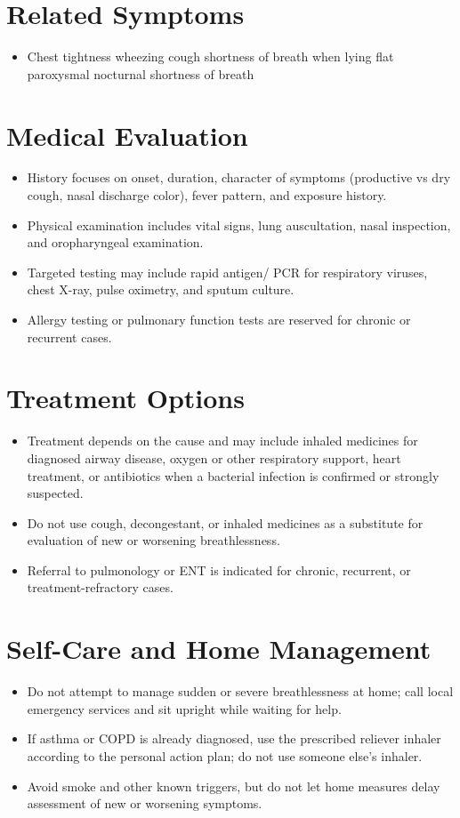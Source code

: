 \section*{Related Symptoms}
\begin{itemize}
  \item Chest tightness wheezing cough shortness of breath when lying flat paroxysmal nocturnal shortness of breath
\end{itemize}

\section*{Medical Evaluation}
\begin{itemize}
  \item History focuses on onset, duration, character of symptoms (productive vs dry cough, nasal discharge color), fever pattern, and exposure history.
  \item Physical examination includes vital signs, lung auscultation, nasal inspection, and oropharyngeal examination.
  \item Targeted testing may include rapid antigen/ PCR for respiratory viruses, chest X-ray, pulse oximetry, and sputum culture.
  \item Allergy testing or pulmonary function tests are reserved for chronic or recurrent cases.
\end{itemize}

\section*{Treatment Options}
\begin{itemize}
  \item Treatment depends on the cause and may include inhaled medicines for diagnosed airway disease, oxygen or other respiratory support, heart treatment, or antibiotics when a bacterial infection is confirmed or strongly suspected.
  \item Do not use cough, decongestant, or inhaled medicines as a substitute for evaluation of new or worsening breathlessness.
  \item Referral to pulmonology or ENT is indicated for chronic, recurrent, or treatment-refractory cases.
\end{itemize}

\section*{Self-Care and Home Management}
\begin{itemize}
  \item Do not attempt to manage sudden or severe breathlessness at home; call local emergency services and sit upright while waiting for help.
  \item If asthma or COPD is already diagnosed, use the prescribed reliever inhaler according to the personal action plan; do not use someone else’s inhaler.
  \item Avoid smoke and other known triggers, but do not let home measures delay assessment of new or worsening symptoms.
\end{itemize}

